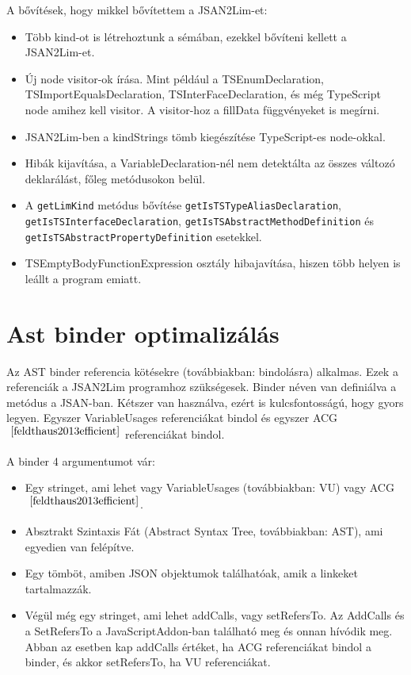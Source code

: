 A bővítések, hogy mikkel bővítettem a JSAN2Lim-et:
\begin{itemize}
      \item Több kind-ot is létrehoztunk a sémában, ezekkel bővíteni kellett a JSAN2Lim-et.
      \item Új node visitor-ok írása. Mint például a TSEnumDeclaration, TSImportEqualsDeclaration, TSInterFaceDeclaration, és még TypeScript node amihez kell visitor.
      A visitor-hoz a fillData függvényeket is megírni.
      \item JSAN2Lim-ben a kindStrings tömb kiegészítése TypeScript-es node-okkal.
      \item Hibák kijavítása, a VariableDeclaration-nél nem detektálta az összes változó deklarálást, főleg metódusokon belül.
      \item A \texttt{getLimKind} metódus bővítése \texttt{getIsTSTypeAliasDeclaration}, \texttt{getIsTSInterfaceDeclaration},
      \texttt{getIsTSAbstractMethodDefinition} és \texttt{getIsTSAbstractPropertyDefinition} esetekkel.
      \item TSEmptyBodyFunctionExpression osztály hibajavítása, hiszen több helyen is leállt a program emiatt.
\end{itemize}

\section{Ast binder optimalizálás}

\noindent

Az AST binder referencia kötésekre (továbbiakban: bindolásra) alkalmas. Ezek a referenciák a JSAN2Lim programhoz szükségesek.
Binder néven van definiálva a metódus a JSAN-ban.
Kétszer van használva, ezért is kulcsfontosságú, hogy gyors legyen.
Egyszer VariableUsages referenciákat bindol és egyszer ACG$^{~\cite{feldthaus2013efficient}}$  referenciákat bindol.

\noindent

A binder 4 argumentumot vár:

\begin{itemize}
      \item Egy stringet, ami lehet vagy VariableUsages (továbbiakban: VU) vagy ACG$^{~\cite{feldthaus2013efficient}}$.
      \item Absztrakt Szintaxis Fát (Abstract Syntax Tree, továbbiakban: AST), ami egyedien van felépítve.
      \item Egy tömböt, amiben JSON objektumok találhatóak, amik a linkeket tartalmazzák.
      \item Végül még egy stringet, ami lehet addCalls, vagy setRefersTo. Az AddCalls és a SetRefersTo a JavaScriptAddon-ban található meg és onnan hívódik meg.
      Abban az esetben kap addCalls értéket, ha ACG  referenciákat bindol a binder, és akkor setRefersTo, ha VU referenciákat.
\end{itemize}

